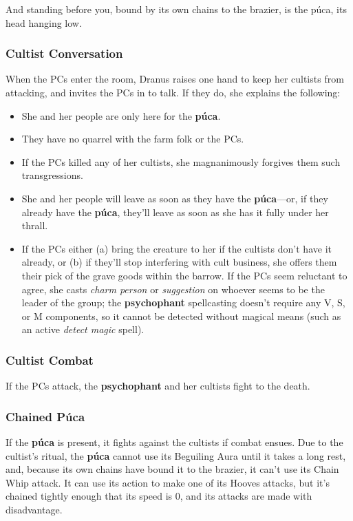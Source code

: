 \documentclass[10pt,a4paper,twoside,bg=print,twocolumn,openany,nodeprecatedcode]{dndbook}
\begin{document}
\begin{DndReadAloud}{}
And standing before you, bound by its own chains to the brazier, is the púca, its head hanging low.

\end{DndReadAloud}

\subsubsection{Cultist Conversation}
When the PCs enter the room, Dranus raises one hand to keep her cultists from attacking, and invites the PCs in to talk. If they do, she explains the following:


\begin{itemize}
\item She and her people are only here for the \textbf{púca}.
\item They have no quarrel with the farm folk or the PCs.
\item If the PCs killed any of her cultists, she magnanimously forgives them such transgressions.
\item She and her people will leave as soon as they have the \textbf{púca}—or, if they already have the \textbf{púca}, they'll leave as soon as she has it fully under her thrall.
\item If the PCs either (a) bring the creature to her if the cultists don't have it already, or (b) if they'll stop interfering with cult business, she offers them their pick of the grave goods within the barrow. If the PCs seem reluctant to agree, she casts \textit{charm person} or \textit{suggestion} on whoever seems to be the leader of the group; the \textbf{psychophant} spellcasting doesn't require any V, S, or M components, so it cannot be detected without magical means (such as an active \textit{detect magic} spell).
\end{itemize}

\subsubsection{Cultist Combat}
If the PCs attack, the \textbf{psychophant} and her cultists fight to the death.

\subsubsection{Chained Púca}
If the \textbf{púca} is present, it fights against the cultists if combat ensues. Due to the cultist's ritual, the \textbf{púca} cannot use its Beguiling Aura until it takes a long rest, and, because its own chains have bound it to the brazier, it can't use its Chain Whip attack. It can use its action to make one of its Hooves attacks, but it's chained tightly enough that its speed is 0, and its attacks are made with disadvantage.
\end{document}
